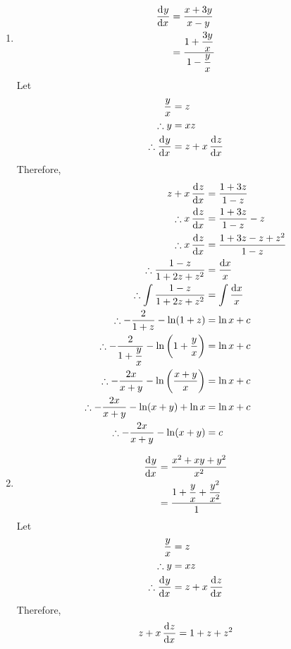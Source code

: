 \documentclass[fleqn, a4paper, 12pt, oneside]{amsart}
\theoremstyle{definition}
\theoremstyle{theorem}
\begin{document}
\begin{solution}
	\begin{enumerate}[leftmargin=*]
		\item
			\begin{align*}
				\dod{y}{x} &= \dfrac{x + 3y}{x - y}\\
				&= \dfrac{1 + \dfrac{3y}{x}}{1 - \dfrac{y}{x}}
			\end{align*}
			Let
			\begin{align*}
				\dfrac{y}{x} &= z\\
				\therefore y &= x z\\
				\therefore \dod{y}{x} &= z + x \dod{z}{x}
			\end{align*}
			Therefore,
			\begin{align*}
				z + x \dod{z}{x} &= \dfrac{1 + 3z}{1 - z}\\
				\therefore x \dod{z}{x} &= \dfrac{1 + 3z}{1 - z} - z\\
				\therefore x \dod{z}{x} &= \dfrac{1 + 3z - z + z^2}{1 - z}\\
				\therefore \dfrac{1 - z}{1 + 2z + z^2} &= \dfrac{\dif x}{x}\\
				\therefore \int \dfrac{1 - z}{1 + 2z + z^2} &= \int \dfrac{\dif x}{x}\\
				\therefore -\dfrac{2}{1 + z} - \ln (1 + z) &= \ln x + c\\
				\therefore -\dfrac{2}{1 + \dfrac{y}{x}} - \ln \left( 1 + \dfrac{y}{x} \right) &= \ln x + c\\
				\therefore -\dfrac{2x}{x + y} - \ln \left( \dfrac{x + y}{x} \right) &= \ln x + c\\
				\therefore -\dfrac{2x}{x + y} - \ln (x + y) + \ln x &= \ln x + c\\
				\therefore -\dfrac{2x}{x + y} - \ln (x + y) &= c
			\end{align*}
		\item
			\begin{align*}
				\dod{y}{x} &= \dfrac{x^2 + xy + y^2}{x^2}\\
				&= \dfrac{1 + \dfrac{y}{x} + \dfrac{y^2}{x^2}}{1}
			\end{align*}
			Let
			\begin{align*}
				\dfrac{y}{x} &= z\\
				\therefore y &= x z\\
				\therefore \dod{y}{x} &= z + x \dod{z}{x}
			\end{align*}
			Therefore,
			\begin{align*}
				z + x \dod{z}{x} &= 1 + z + z^2\\

\end{align*}
\end{enumerate}
\end{solution}
\end{document}
